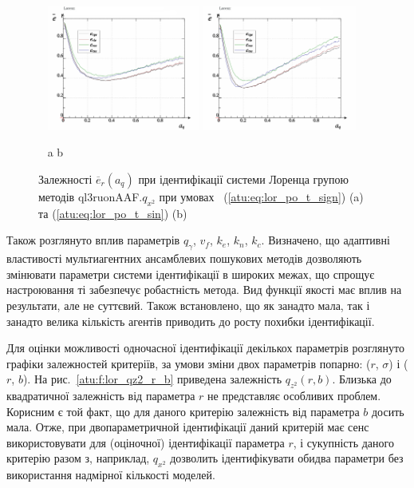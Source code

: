 \documentclass[a4paper,13pt]{atuaref}
\begin{document}
\begin{figure}[ht!]
  \centerline{
    ~ \hfill
    \includegraphics[width=0.45\textwidth]{p5/p/cha/lor/ql3ruonAAF/lor_ql3ruonAAF_qx2-p_a_q_e_sign_xl.png}
    \hfill
    \includegraphics[width=0.45\textwidth]{p5/p/cha/lor/ql3ruonAAF/lor_ql3ruonAAF_qx2-p_a_q_e_sin_xl.png}
    \hfill ~
  }
  \vspace{-1.5ex}
  \begin{center}
    ~ \hfill a \hfill\hfill b  \hfill ~
  \end{center}
  \vspace{-2.5ex}
  \caption{Залежності $\overline{e}_{r}(a_q)$ при ідентифікації системи Лоренца групою методів ql3ruonAAF.$q_{x^2}$
   при умовах ~(\ref{atu:eq:lor_po_t_sign}) (a) та (\ref{atu:eq:lor_po_t_sin}) (b)}
  \label{atu:f:lor_a_q_ql3ruonAAF.q_x2}
\end{figure}

Також розглянуто вплив параметрів $q_\gamma$, $v_f$, $k_e$, $k_n$, $k_c$.
Визначено, що адаптивні властивості мультиагентних ансамблевих пошукових методів дозволяють
змінювати параметри системи ідентифікації в широких межах,
що спрощує настроювання ті забезпечує робастність метода.
Вид функції якості має вплив на результати, але не суттєвий.
Також встановлено, що як занадто мала, так і занадто велика кількість агентів
приводить до росту похибки ідентифікації.

Для оцінки можливості одночасної ідентифікації декількох параметрів
розглянуто графіки залежностей критеріїв, за умови зміни двох параметрів
попарно: ($r$, $\sigma$) і ($r$, $b$).
На рис.~\ref{atu:f:lor_qz2_r_b}
приведена залежність
$q_{z^2}(r,b)$.
Близька до квадратичної залежність від параметра $r$ не представляє особливих
проблем. Корисним є той факт, що для даного критерію залежність від параметра $b$
досить мала. Отже, при двопараметричной ідентифікації даний критерій має
сенс використовувати для (оціночної) ідентифікації параметра $r$, і
сукупність даного критерію разом з, наприклад, $q_{x^2}$ дозволить
ідентифікувати обидва параметри без використання надмірної кількості моделей.
\end{document}

